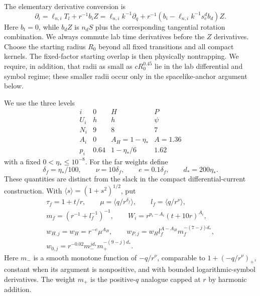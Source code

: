 The elementary derivative conversion is
\begin{equation}\label{far:derivative-conversion}
 \partial_i=\ell_{n,i}T_l+r^{-1}b_iZ
 =\ell_{n,i}k^{-1}\partial_q
  +r^{-1}(b_i-\ell_{n,i}k^{-1}s_e^db_d)Z.
\end{equation}
Here $b_t=0$, while $b_dZ$ is $n_dS$ plus the corresponding tangential
rotation combination.  We always commute lab time derivatives before
the $Z$ derivatives.  Choose the starting radius $R_0$ beyond all fixed
transitions and all compact kernels.  The fixed-factor starting overlap
is then physically nontrapping.  We require, in addition, that radii as
small as $cR_0^{0.45}$ lie in the lab differential and symbol regime;
these smaller radii occur only in the spacelike-anchor argument below.

We use the three levels
\begin{equation}\label{far:levels}
\begin{array}{c|ccc}
 i&0&H&P\\ \hline
 U_i&h&h&\psi\\
 N_i&9&8&7\\
 A_i&0&A_H=1-\eta_*&A=1.36\\
 p_i&0.64&1-\eta_*/6&1.62
\end{array}
\end{equation}
with a fixed $0<\eta_*\le 10^{-8}$.  For the far weights define
\[
 \delta_f=\eta_*/100,\qquad \nu=10\delta_f,
 \qquad e=0.1\delta_f,\qquad d_*=200\eta_*.
\]
These quantities are distinct from the slack in the compact
differential-current construction.  With $\langle s\rangle=(1+s^2)^{1/2}$,
put
\begin{equation}\label{far:weights}
 \begin{gathered}
 \tau_f=1+t/r,\qquad \mu=\langle q/r^{\delta_f}\rangle,
 \qquad l_f=\langle q/r^\nu\rangle,\\
 m_f=(r^{-1}+l_f^{-1})^{-1},\qquad
 W_i=r^{p_i-A_i}(t+10r)^{A_i},\\
 w_{H,j}=w_H=r^{-e}\mu^{A_H},\qquad
 w_{P,j}=w_Hl_f^{A-A_H}m_f^{-(7-j)d_*},\\
 w_{0,j}=r^{-0.02}m_-^{jd_*}m_+^{-(9-j)d_*}.
 \end{gathered}
\end{equation}
Here $m_-$ is a smooth monotone function of $-q/r^\nu$, comparable to
$1+(-q/r^\nu)_+$, constant when its argument is nonpositive, and with
bounded logarithmic-symbol derivatives.  The weight $m_+$ is the
positive-$q$ analogue capped at $r$ by harmonic addition.

